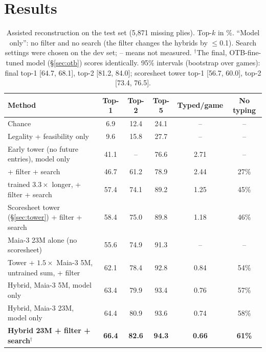 \documentclass[11pt]{article}
\begin{document}
\section{Results}

\begin{table}[t]
\centering
\small
\begin{tabular}{lccccc}
\toprule
Method & Top-1 & Top-2 & Top-5 & Typed/game & No typing \\
\midrule
Chance & 6.9 & 12.4 & 24.1 & -- & -- \\
Legality + feasibility only & 9.6 & 15.8 & 27.7 & -- & -- \\
Early tower (no future entries), model only & 41.1 & -- & 76.6 & 2.71 & -- \\
\quad + filter + search & 46.7 & 61.2 & 78.9 & 2.44 & 27\% \\
\quad trained $3.3\times$ longer, + filter + search & 57.4 & 74.1 & 89.2 & 1.25 & 45\% \\
Scoresheet tower (\S\ref{sec:tower}) + filter + search & 58.4 & 75.0 & 89.8 & 1.18 & 46\% \\
Maia-3 23M alone (no scoresheet) & 55.6 & 74.9 & 91.3 & -- & -- \\
Tower + $1.5\times$ Maia-3 5M, untrained sum, + filter & 62.1 & 78.4 & 92.8 & 0.84 & 54\% \\
Hybrid, Maia-3 5M, model only & 63.4 & 79.9 & 93.4 & 0.76 & 57\% \\
Hybrid, Maia-3 23M, model only & 64.4 & 80.9 & 93.6 & 0.74 & 58\% \\
\textbf{Hybrid 23M + filter + search$^\dagger$} & \textbf{66.4} & \textbf{82.6} & \textbf{94.3} & \textbf{0.66} & \textbf{61\%} \\
\bottomrule
\end{tabular}
\caption{Assisted reconstruction on the test set (5,871 missing plies). Top-$k$ in \%. ``Model only'': no filter and no search (the filter changes the hybrids by $\le$0.1). Search settings were chosen on the dev set; -- means not measured. $^\dagger$The final, OTB-fine-tuned model (\S\ref{sec:otb}) scores identically. 95\% intervals (bootstrap over games): final top-1 [64.7, 68.1], top-2 [81.2, 84.0]; scoresheet tower top-1 [56.7, 60.0], top-2 [73.4, 76.5].}
\label{tab:main}
\end{table}
\end{document}
